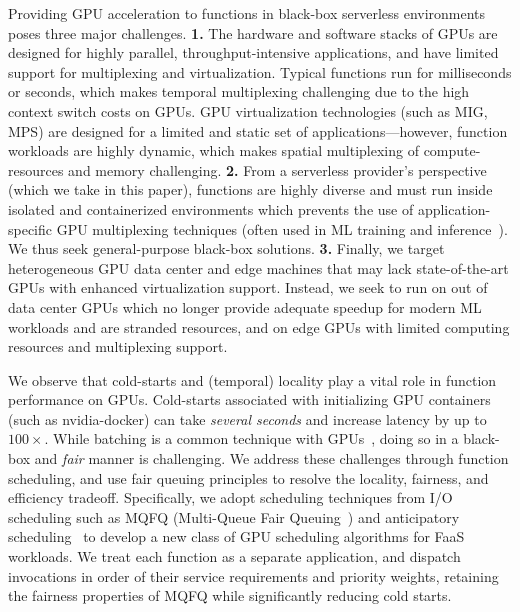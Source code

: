 Providing GPU acceleration to functions in black-box serverless environments poses three major  challenges.
\textbf{1.} The hardware and software stacks of GPUs are designed for highly parallel, throughput-intensive applications, and have limited support for multiplexing and virtualization.
Typical functions run for milliseconds or seconds, which makes temporal multiplexing challenging due to the high context switch costs on GPUs.
GPU virtualization technologies (such as MIG, MPS) are designed for a limited and static set of applications---however, function workloads are highly dynamic, which makes spatial multiplexing of compute-resources and memory challenging.
\textbf{2.} From a serverless provider's perspective (which we take in this paper), functions are highly diverse and must run inside isolated and containerized environments which prevents the use of application-specific GPU multiplexing techniques (often used in ML training and inference~\cite{pemberton2022kernel, ng2023paella, fingler2022dgsf, gu2023fast}).
We thus seek general-purpose black-box solutions. 
\textbf{3.} Finally, we target heterogeneous GPU data center and edge machines that may lack state-of-the-art GPUs with enhanced virtualization support.
Instead, we seek to run on out of data center GPUs which no longer provide adequate speedup for modern ML workloads and are stranded resources, and on edge GPUs with limited computing resources and multiplexing support. 


We observe that cold-starts and (temporal) locality play a vital role in function performance on GPUs.
Cold-starts associated with initializing GPU containers (such as nvidia-docker) can take \emph{several seconds} and increase latency by up to $100\times$. 
While batching is a common technique with GPUs~\cite{ali2022optimizing}, doing so in a black-box and \emph{fair} manner is challenging. 
We address these challenges through function scheduling, and use fair queuing principles to resolve the locality, fairness, and efficiency tradeoff.
Specifically, we adopt scheduling techniques from I/O scheduling such as MQFQ (Multi-Queue Fair Queuing~\cite{hedayati2019multi}) and anticipatory scheduling~\cite{iyer2001anticipatory} to develop a new class of GPU scheduling algorithms for FaaS workloads.
We treat each function as a separate application, and dispatch invocations in order of their service requirements and priority weights, retaining the fairness properties of MQFQ while significantly reducing cold starts.

